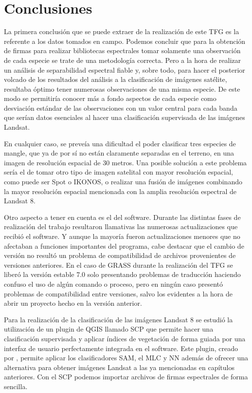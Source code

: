 


\chapter{Conclusiones}

La primera conclusión que se puede extraer de la realización de este \ac{TFG} es la referente a los datos tomados en campo. Podemos concluir que para la obtención de firmas para realizar bibliotecas espectrales tomar solamente una observación de cada especie se trate de una metodología correcta. Pero a la hora de realizar un análisis de separabilidad espectral fiable y, sobre todo, para hacer el posterior volcado de los resultados del análisis a la clasificación de imágenes satélite, resultaba óptimo tener numerosas observaciones de una misma especie. De este modo se permitiría conocer más a fondo aspectos de cada especie como desviación estándar de las observaciones con un valor central para cada banda que serían datos esenciales al hacer una clasificación supervisada de las imágenes Landsat.\Sep

En cualquier caso, se preveía una dificultad el poder clasificar tres especies de mangle, que ya de por sí no están claramente separadas en el terreno, en una imagen de resolución espacial de 30 metros. Una posible solución a este problema sería el de tomar otro tipo de imagen satelital con mayor resolución espacial, como puede ser Spot o IKONOS, o realizar una fusión de imágenes combinando la mayor resolución espacial mencionada con la amplia resolución espectral de Landsat 8.\Sep

Otro aspecto a tener en cuenta es el del software. Durante las distintas fases de realización del trabajo resultaron llamativas las numerosas actualizaciones que recibió el software. Y aunque la mayoría fueron actualizaciones menores que no afectaban a funciones importantes del programa, cabe destacar que el cambio de versión no resultó un problema de compatibilidad de archivos provenientes de versiones anteriores. En el caso de GRASS durante la realización del \ac{TFG} se liberó la versión estable 7.0 solo presentando problemas de traducción haciendo confuso el uso de algún comando o proceso, pero en ningún caso presentó problemas de compatibilidad entre versiones, salvo los evidentes a la hora de abrir un proyecto hecho en la versión anterior.\Sep

Para la realización de la clasificación de las imágenes Landsat 8 se estudió la utilización de un plugin de QGIS llamado \ac{SCP} que permite hacer una clasificación supervisada y aplicar índices de vegetación de forma guiada por una interfaz de usuario perfectamente integrada en el software. Este plugin, creado por \cite{Congedo2015}, permite aplicar los clasificadores \ac{SAM}, el \ac{MLC} y \ac{NN} además de ofrecer una alternativa para obtener imágenes Landsat a las ya mencionadas en capítulos anteriores. Con el \ac{SCP} podemos importar archivos de firmas espectrales de forma sencilla.\Sep

